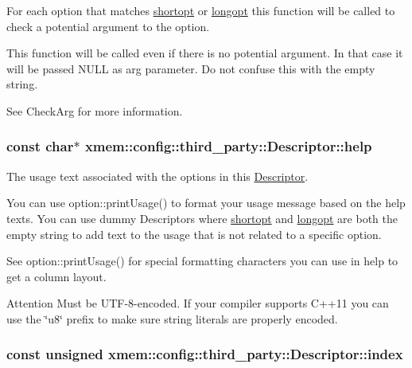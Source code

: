 For each option that matches \hyperlink{structxmem_1_1config_1_1third__party_1_1_descriptor_ac2dfb6bb8ca2f4aabf964a910cf0d59b}{shortopt} or \hyperlink{structxmem_1_1config_1_1third__party_1_1_descriptor_a7246a4bfc669f68bb406dece398be7bb}{longopt} this function will be called to check a potential argument to the option. 

This function will be called even if there is no potential argument. In that case it will be passed {\ttfamily N\-U\-L\-L} as {\ttfamily arg} parameter. Do not confuse this with the empty string.

See Check\-Arg for more information. \hypertarget{structxmem_1_1config_1_1third__party_1_1_descriptor_a099340907003981132a053856dac0eaa}{
\subsubsection[{help}]{\setlength{\rightskip}{0pt plus 5cm}const char$\ast$ xmem\-::config\-::third\-\_\-party\-::\-Descriptor\-::help}}\label{structxmem_1_1config_1_1third__party_1_1_descriptor_a099340907003981132a053856dac0eaa}


The usage text associated with the options in this \hyperlink{structxmem_1_1config_1_1third__party_1_1_descriptor}{Descriptor}. 

You can use option\-::print\-Usage() to format your usage message based on the {\ttfamily help} texts. You can use dummy Descriptors where \hyperlink{structxmem_1_1config_1_1third__party_1_1_descriptor_ac2dfb6bb8ca2f4aabf964a910cf0d59b}{shortopt} and \hyperlink{structxmem_1_1config_1_1third__party_1_1_descriptor_a7246a4bfc669f68bb406dece398be7bb}{longopt} are both the empty string to add text to the usage that is not related to a specific option.

See option\-::print\-Usage() for special formatting characters you can use in {\ttfamily help} to get a column layout.

\begin{DoxyAttention}{Attention}
Must be U\-T\-F-\/8-\/encoded. If your compiler supports C++11 you can use the \char`\"{}u8\char`\"{} prefix to make sure string literals are properly encoded. 
\end{DoxyAttention}
\hypertarget{structxmem_1_1config_1_1third__party_1_1_descriptor_aacf3d44f35c61f22be65da078f60734b}{
\subsubsection[{index}]{\setlength{\rightskip}{0pt plus 5cm}const unsigned xmem\-::config\-::third\-\_\-party\-::\-Descriptor\-::index}}\label{structxmem_1_1config_1_1third__party_1_1_descriptor_aacf3d44f35c61f22be65da078f60734b}


